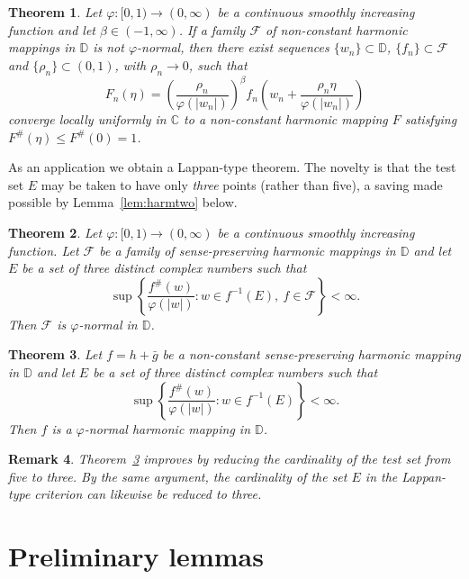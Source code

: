 \documentclass[10pt,a4paper]{amsart}
\newtheorem{theorem}{Theorem}[section]
\newtheorem{remark}[theorem]{Remark}
\newcommand{\D}{\mathbb{D}}
\newcommand{\C}{\mathbb{C}}
\begin{document}
\begin{theorem}\label{thm:rescalefamily}
Let $\varphi\colon[0,1)\to(0,\infty)$ be a continuous smoothly increasing function and let
$\beta\in(-1,\infty)$. If a family $\mathcal F$ of non-constant harmonic mappings in $\D$ is
\emph{not} $\varphi$-normal, then there exist sequences $\{w_{n}\}\subset\D$,
$\{f_{n}\}\subset\mathcal F$ and $\{\rho_{n}\}\subset(0,1)$, with $\rho_{n}\to0$, such that
\[
F_{n}(\eta)=\left(\frac{\rho_{n}}{\varphi(|w_{n}|)}\right)^{\beta}
f_{n}\!\left(w_{n}+\frac{\rho_{n}\eta}{\varphi(|w_{n}|)}\right)
\]
converge locally uniformly in $\C$ to a non-constant harmonic mapping $F$ satisfying
$F^{\#}(\eta)\le F^{\#}(0)=1$.
\end{theorem}

As an application we obtain a Lappan-type theorem. The novelty is that the test set $E$ may
be taken to have only \emph{three} points (rather than five), a saving made possible by
Lemma~\ref{lem:harmtwo} below.

\begin{theorem}\label{thm:lappanfamily}
Let $\varphi\colon[0,1)\to(0,\infty)$ be a continuous smoothly increasing function. Let
$\mathcal F$ be a family of sense-preserving harmonic mappings in $\D$ and let $E$ be a set
of three distinct complex numbers such that
\[
\sup\left\{\frac{f^{\#}(w)}{\varphi(|w|)}:w\in f^{-1}(E),\ f\in\mathcal F\right\}<\infty.
\]
Then $\mathcal F$ is $\varphi$-normal in $\D$.
\end{theorem}

\begin{theorem}\label{thm:lappansingle}
Let $f=h+\bar g$ be a non-constant sense-preserving harmonic mapping in $\D$ and let $E$ be
a set of three distinct complex numbers such that
\[
\sup\left\{\frac{f^{\#}(w)}{\varphi(|w|)}:w\in f^{-1}(E)\right\}<\infty.
\]
Then $f$ is a $\varphi$-normal harmonic mapping in $\D$.
\end{theorem}

\begin{remark}\label{rem:improveBDP}
Theorem~\ref{thm:lappansingle} improves \cite[Theorem~1.6]{BDP} by reducing the cardinality
of the test set from five to three. By the same argument, the cardinality of the set $E$ in
the Lappan-type criterion \cite[Theorem~1.6]{BT} can likewise be reduced to three.
\end{remark}

\section{Preliminary lemmas}
\end{document}
